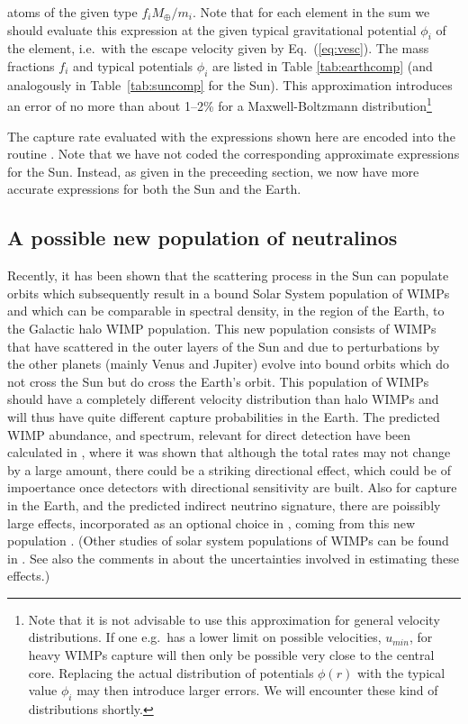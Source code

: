atoms of the given type $f_i M_\oplus/m_i$. Note that for each element
in the sum we should evaluate this expression at the given typical
gravitational potential $\phi_i$ of the element, i.e.\ with the escape
velocity given by Eq.~(\ref{eq:vesc}). The mass fractions $f_i$ and
typical potentials $\phi_i$ are listed in Table
\ref{tab:earthcomp} (and analogously in Table~\ref{tab:suncomp} for
the Sun). This approximation introduces an error of no more
than about 1--2\% for a Maxwell-Boltzmann distribution\footnote{Note
  that it is not advisable to use this approximation for general
  velocity distributions. If one e.g.\ has a lower limit on possible
  velocities, $u_{min}$, for heavy WIMPs capture will then only be
  possible very close to the central core. Replacing the actual
  distribution of potentials $\phi(r)$ with the typical value $\phi_i$
  may then introduce larger errors. We will encounter these kind of
  distributions shortly.} 

The capture rate evaluated with the expressions shown here are encoded
into the routine . Note that we have not coded the
corresponding approximate expressions for the Sun. Instead, as given
in the preceeding section, we now have more accurate expressions for
both the Sun and the Earth.

\subsection{A possible new population of neutralinos}\label{sec:dk}

Recently, it has been shown that the scattering process in the Sun can
populate orbits which subsequently result in a bound Solar System
population of WIMPs~\cite{dk1,dk2} and which can be comparable in
spectral density, in the region of the Earth, to the Galactic halo
WIMP population.  This new population consists of WIMPs that have
scattered in the outer layers of the Sun and due to perturbations by
the other planets (mainly Venus and Jupiter) evolve into bound orbits
which do not cross the Sun but do cross the Earth's orbit.  This
population of WIMPs should have a completely different velocity
distribution than halo WIMPs and will thus have quite different
capture probabilities in the Earth.  The predicted WIMP abundance, and
spectrum, relevant for direct detection have been calculated in
\cite{dk1,dk2}, where it was shown that although the total rates may
not change by a large amount, there could be a striking directional
effect, which could be of impoertance once detectors with directional
sensitivity are built.  Also for capture in the Earth, and the
predicted indirect neutrino signature, there are poissibly large
effects, incorporated as an optional choice in \ds, coming from this
new population \cite{dkpop}.  (Other studies of solar system
populations of WIMPs can be found in \cite{otherpop,Gould91}.  See
also the comments in \cite{gouldnew} about the uncertainties involved
in estimating these effects.)


